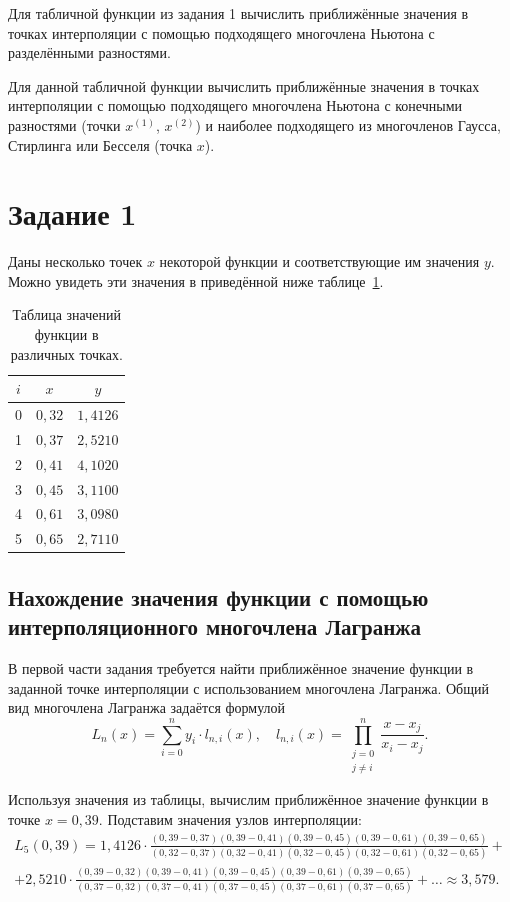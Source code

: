 \documentclass[a4paper, final]{article}
\begin{document}
Для табличной функции из задания 1 вычислить приближённые значения в точках интерполяции с помощью подходящего многочлена Ньютона с разделёнными разностями.

Для данной табличной функции вычислить приближённые значения в точках интерполяции с помощью подходящего многочлена Ньютона с конечными разностями (точки $x^{(1)}$, $x^{(2)}$) и наиболее подходящего из многочленов Гаусса, Стирлинга или Бесселя (точка $x$).

\newpage

\section{Задание 1}

Даны несколько точек $x$ некоторой функции и соответствующие им значения $y$.
Можно увидеть эти значения в приведённой ниже таблице~\ref{tab:task1}.

\begin{table}[h!]
\centering
\begin{tabular}{|c|c|c|}
\hline
$i$ & $x$ & $y$ \\
\hline
0 & $0{,}32$ & $1{,}4126$ \\
1 & $0{,}37$ & $2{,}5210$ \\
2 & $0{,}41$ & $4{,}1020$ \\
3 & $0{,}45$ & $3{,}1100$ \\
4 & $0{,}61$ & $3{,}0980$ \\
5 & $0{,}65$ & $2{,}7110$ \\
\hline
\end{tabular}
\caption{Таблица значений функции в различных точках.}
\label{tab:task1}
\end{table}

\subsection{Нахождение значения функции с помощью интерполяционного многочлена Лагранжа}

В первой части задания требуется найти приближённое значение функции в заданной точке интерполяции с использованием многочлена Лагранжа. Общий вид многочлена Лагранжа задаётся формулой
\[
L_n(x) = \sum_{i=0}^{n} y_i \cdot l_{n,i}(x), \quad l_{n,i}(x) = \prod_{\substack{j=0 \\ j \neq i}}^{n} \dfrac{x - x_j}{x_i - x_j}.
\]

Используя значения из таблицы, вычислим приближённое значение функции в точке \(x = 0{,}39\). Подставим значения узлов интерполяции:
\begin{multline*}
L_5(0{,}39) = 1{,}4126 \cdot \frac{(0{,}39-0{,}37)(0{,}39-0{,}41)(0{,}39-0{,}45)(0{,}39-0{,}61)(0{,}39-0{,}65)}{(0{,}32-0{,}37)(0{,}32-0{,}41)(0{,}32-0{,}45)(0{,}32-0{,}61)(0{,}32-0{,}65)} + \\
+ 2{,}5210 \cdot \frac{(0{,}39-0{,}32)(0{,}39-0{,}41)(0{,}39-0{,}45)(0{,}39-0{,}61)(0{,}39-0{,}65)}{(0{,}37-0{,}32)(0{,}37-0{,}41)(0{,}37-0{,}45)(0{,}37-0{,}61)(0{,}37-0{,}65)} + \dots \approx 3{,}579.
\end{multline*}
\end{document}
